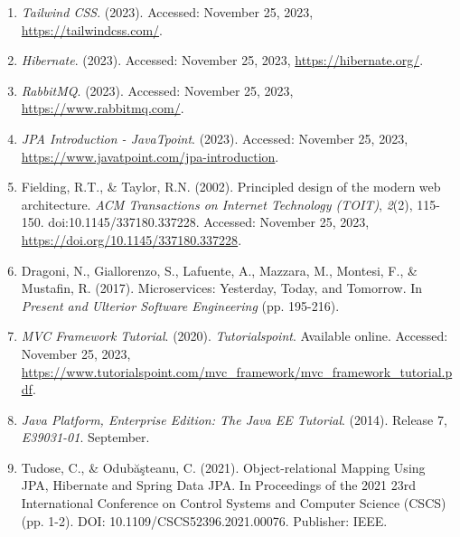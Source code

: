 \documentclass{article}
\begin{document}
\begin{enumerate}
    \item \textit{Tailwind CSS}. (2023). Accessed: November 25, 2023, \url{https://tailwindcss.com/}.

    \item \textit{Hibernate}. (2023). Accessed: November 25, 2023, \url{https://hibernate.org/}.

    \item \textit{RabbitMQ}. (2023). Accessed: November 25, 2023, \url{https://www.rabbitmq.com/}.

    \item \textit{JPA Introduction - JavaTpoint}. (2023). Accessed: November 25, 2023, \url{https://www.javatpoint.com/jpa-introduction}.

    \item Fielding, R.T., & Taylor, R.N. (2002). Principled design of the modern web architecture. \textit{ACM Transactions on Internet Technology (TOIT)}, \textit{2}(2), 115-150. doi:10.1145/337180.337228. Accessed: November 25, 2023, \url{https://doi.org/10.1145/337180.337228}.

    \item Dragoni, N., Giallorenzo, S., Lafuente, A., Mazzara, M., Montesi, F., & Mustafin, R. (2017). Microservices: Yesterday, Today, and Tomorrow. In \textit{Present and Ulterior Software Engineering} (pp. 195-216).

    \item \textit{MVC Framework Tutorial}. (2020). \textit{Tutorialspoint}. Available online. Accessed: November 25, 2023, \url{https://www.tutorialspoint.com/mvc_framework/mvc_framework_tutorial.pdf}.

    \item \textit{Java Platform, Enterprise Edition: The Java EE Tutorial}. (2014). Release 7, \textit{E39031-01}. September.

    \item Tudose, C., & Odubăşteanu, C. (2021). Object-relational Mapping Using JPA, Hibernate and Spring Data JPA. In Proceedings of the 2021 23rd International Conference on Control Systems and Computer Science (CSCS) (pp. 1-2). DOI: 10.1109/CSCS52396.2021.00076. Publisher: IEEE.

\end{enumerate}
\end{document}
